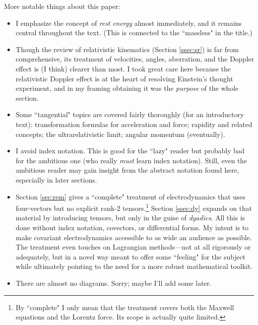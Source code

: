 \documentclass[12pt]{article}
\begin{document}
More notable things about this paper:
\begin{itemize}
\item I emphasize the concept of \emph{rest energy} almost immediately, and it remains central throughout the text. (This is connected to the ``massless" in the title.)
\item Though the review of relativistic kinematics (Section \ref{ssec:sr}) is far from comprehensive, its treatment of velocities, angles, aberration, and the Doppler effect is (I think) clearer than most. I took great care here because the relativistic Doppler effect is at the heart of resolving Einstein's thought experiment, and in my framing obtaining it was the \emph{purpose} of the whole section.
\item Some ``tangential" topics are covered fairly thoroughly (for an introductory text): transformation formulas for acceleration and force; rapidity and related concepts; the ultrarelativistic limit; angular momentum (eventually).
\item I avoid index notation. This is good for the ``lazy" reader but probably bad for the ambitious one (who really \emph{must} learn index notation). Still, even the ambitious reader may gain insight from the abstract notation found here, especially in later sections.
\item Section \ref{sec:rem} gives a ``complete" treatment of electrodynamics that uses four-vectors but no explicit rank-2 tensors.\footnote{By ``complete" I only mean that the treatment covers both the Maxwell equations and the Lorentz force. Its scope is actually quite limited.} Section \ref{ssec:dy} expands on that material by introducing tensors, but only in the guise of \emph{dyadics}. All this is done without index notation, covectors, or differential forms. My intent is to make covariant electrodynamics accessible to as wide an audience as possible. The treatment even touches on Lagrangian methods---not at all rigorously or adequately, but in a novel way meant to offer some ``feeling" for the subject while ultimately pointing to the need for a more robust mathematical toolkit.
\item There are almost no diagrams. Sorry; maybe I'll add some later.
\end{itemize}
\end{document}
